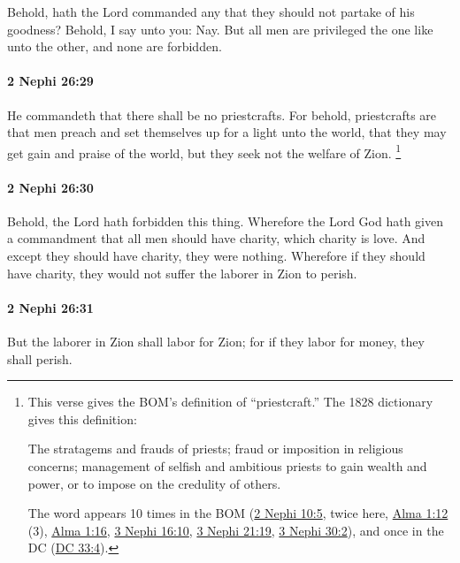 			Behold, hath the Lord commanded any
			that they should not partake of his goodness?
			Behold, I say unto you: Nay.
			But all men are privileged the one like unto the other,
			and none are forbidden.

		\paragraph{2 Nephi 26:29} %
			\label{2NEPHI-26-29}

			He commandeth that there shall be no priestcrafts.
			For behold, priestcrafts are that men preach and set themselves up
			for a light unto the world,
			that they may get gain and praise of the world,
			but they seek not the welfare of Zion.%
				\footnote{%
					This verse gives the BOM's definition of ``priestcraft.'' The 1828 dictionary gives this definition:
						\begin{compactitem}
							\item The stratagems and frauds of priests; fraud or imposition in religious concerns; management of selfish and ambitious priests to gain wealth and power, or to impose on the credulity of others.
						\end{compactitem}
					The word appears 10 times in the BOM (\hyperref[2NEPHI-10-5]{2 Nephi 10:5}, twice here, \hyperref[ALMA-1-12]{Alma 1:12} (3), \hyperref[ALMA-1-16]{Alma 1:16}, \hyperref[3NEPHI-16-10]{3 Nephi 16:10}, \hyperref[3NEPHI-21-19]{3 Nephi 21:19}, \hyperref[3NEPHI-30-2]{3 Nephi 30:2}), and once in the DC (\hyperref[DC33-4]{DC 33:4}).
					} 

		\paragraph{2 Nephi 26:30} %
			\label{2NEPHI-26-30}

			Behold, the Lord hath forbidden this thing.
			Wherefore the Lord God hath given a commandment
			that all men should have charity, which charity is love.
			And except they should have charity, they were nothing.
			Wherefore if they should have charity,
			they would not suffer the laborer in Zion to perish.

		\paragraph{2 Nephi 26:31} %
			\label{2NEPHI-26-31}

			But the laborer in Zion shall labor for Zion;
			for if they labor for money, they shall perish.

